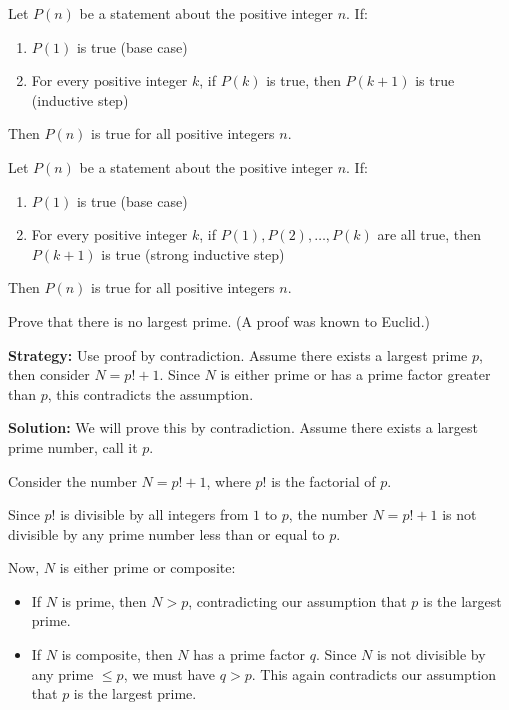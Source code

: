 \begin{theorem}
Let $P(n)$ be a statement about the positive integer $n$. If:
\begin{enumerate}
\item $P(1)$ is true (base case)
\item For every positive integer $k$, if $P(k)$ is true, then $P(k+1)$ is true (inductive step)
\end{enumerate}
Then $P(n)$ is true for all positive integers $n$.
\end{theorem}

\begin{theorem}
Let $P(n)$ be a statement about the positive integer $n$. If:
\begin{enumerate}
\item $P(1)$ is true (base case)
\item For every positive integer $k$, if $P(1), P(2), \ldots, P(k)$ are all true, then $P(k+1)$ is true (strong inductive step)
\end{enumerate}
Then $P(n)$ is true for all positive integers $n$.
\end{theorem}



\begin{problembox}
\begin{problemstatement}
Prove that there is no largest prime. (A proof was known to Euclid.)
\end{problemstatement}
\end{problembox}

\noindent\textbf{Strategy:} Use proof by contradiction. Assume there exists a largest prime $p$, then consider $N = p! + 1$. Since $N$ is either prime or has a prime factor greater than $p$, this contradicts the assumption.

\bigskip\noindent\textbf{Solution:}
We will prove this by contradiction. Assume there exists a largest prime number, call it $p$.

Consider the number $N = p! + 1$, where $p!$ is the factorial of $p$. 

Since $p!$ is divisible by all integers from $1$ to $p$, the number $N = p! + 1$ is not divisible by any prime number less than or equal to $p$.

Now, $N$ is either prime or composite:
\begin{itemize}
\item If $N$ is prime, then $N > p$, contradicting our assumption that $p$ is the largest prime.
\item If $N$ is composite, then $N$ has a prime factor $q$. Since $N$ is not divisible by any prime $\leq p$, we must have $q > p$. This again contradicts our assumption that $p$ is the largest prime.
\end{itemize}

